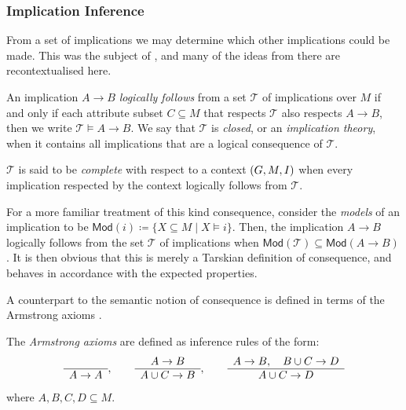 \subsubsection{Implication Inference}
\label{subsubsection:implication-inference}

From a set of implications we may determine which other implications could be made. This was the subject of ,
and many of the ideas from there are recontextualised here.

\begin{definition}
	\label{definition:implication-inference}

	An implication $A\rightarrow B$ \emph{logically follows} from a set $\mathcal{T}$ of implications over $M$ if and only
	if each attribute subset $C \subseteq M$ that respects $\mathcal{T}$ also respects $A \rightarrow B$, then we write
	$\mathcal{T}\vDash A \rightarrow B$. We say that $\mathcal{T}$ is \emph{closed}, or an \emph{implication theory}, when
	it contains all implications that are a logical consequence of $\mathcal{T}$.

	$\mathcal{T}$ is said to be \emph{complete} with respect to a context $(G,M,\mathrel{I})$ when every implication respected by the
	context logically follows from $\mathcal{T}$.
\end{definition}

For a more familiar treatment of this kind consequence, consider the \textit{models} of an implication to be $\mathsf{Mod}
(i) \coloneqq \{X \subseteq M \mid X \vDash i\}$. Then, the implication $A\rightarrow B$ logically follows from the set $\mathcal{T}$
of implications when $\mathsf{Mod}(\mathcal{T}) \subseteq \mathsf{Mod}(A\rightarrow B)$. It is then obvious that this is
merely a Tarskian definition of consequence, and behaves in accordance with the expected properties.

A counterpart to the semantic notion of consequence is defined in terms of the Armstrong axioms \cite{armstrong1974dependency}.

\begin{definition}
	\label{definition:armstrong-axioms} The \emph{Armstrong axioms} are defined as inference rules of the form:
	\begin{align}
		\begin{array}{c}  \\ \hline A \rightarrow A \end{array}, \qquad \begin{array}{c} A \rightarrow B \\ \hline A \cup C \rightarrow B \end{array}, \qquad \begin{array}{c} A \rightarrow B, \quad B \cup C \rightarrow D \\ \hline A \cup C \rightarrow D \end{array}
	\end{align}
	where $A,B,C,D \subseteq M$.
\end{definition}

